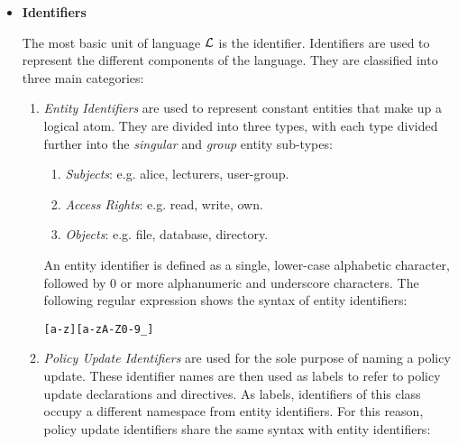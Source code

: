 \documentclass[11pt]{report}
\newenvironment{vverbatim}
{
  \begin{alltt}
}
{
    \vspace{-\baselineskip}
  \end{alltt}
}
\begin{document}
          \begin{itemize}
            \item
              {\bf Identifiers}

              The most basic unit of language $\cal{L}$ is the identifier.
              Identifiers are used to represent the different components of
              the language. They are classified into three main categories:
   
              \begin{enumerate}
                \item
                  {\em Entity Identifiers} are used to represent constant
                  entities that make up a logical atom. They are divided into
                  three types, with each type divided further into the
                  {\em singular} and {\em group} entity sub-types:
   
                  \begin{enumerate}
                    \item
                      {\em Subjects}: e.g. alice, lecturers, user-group.
                    \item
                      {\em Access Rights}: e.g. read, write, own.
                    \item
                      {\em Objects}: e.g. file, database, directory.
                  \end{enumerate}
   
                  An entity identifier is defined as a single, lower-case
                  alphabetic character, followed by 0 or more alphanumeric and
                  underscore characters. The following regular expression
                  shows the syntax of entity identifiers:
   
                  \begin{vverbatim}
  [a-z][a-zA-Z0-9\_]
                  \end{vverbatim}
   
                \item
                  {\em Policy Update Identifiers} are used for the sole
                  purpose of naming a policy update. These identifier names
                  are then used as labels to refer to policy update
                  declarations and directives. As labels, identifiers of this
                  class occupy a different namespace from entity identifiers.
                  For this reason, policy update identifiers share the same
                  syntax with entity identifiers:
   

\end{enumerate}
\end{itemize}
\end{document}
